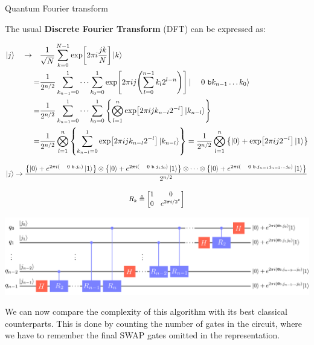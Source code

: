 \documentclass[9pt, handout, aspectratio=169]{beamer}	%
\begin{document}
\begin{frame}[allowframebreaks]{Quantum Fourier transform}

	The usual \textbf{Discrete Fourier Transform} (DFT) can be expressed as:

	\medskip

	\begin{align*}
	  \ket{j} \qra&
				\frac{1}{\sqrt{N}} \sum_{k=0}^{N-1} \exp[2\pi i \frac{jk}{N}] \ket{k} \\
	    =& \frac{1}{2^{n/2}} \sum_{k_{n-1}=0}^{1} \cdots \sum_{k_{0}=0}^{1}
	      \exp[2\pi ij \qty(\sum_{l=0}^{n-1} k_{l} 2^{l-n})]
	      \ket{\bin k_{n-1} \dots k_{0}} \\
	    =& \frac{1}{2^{n/2}} \sum_{k_{n-1}=0}^{1} \cdots \sum_{k_{0}=0}^{1}
	      \qty{ \bigotimes_{l=1}^{n} \exp[2\pi ij k_{n-l} 2^{-l}]
	      \ket{k_{n-l}} } \\
	    =& \frac{1}{2^{n/2}} \bigotimes_{l=1}^{n}
	      \qty{ \sum_{k_{n-l}=0}^{1} \exp[2\pi ij k_{n-l} 2^{-l}] \ket{k_{n-l}} }
	    = \frac{1}{2^{n/2}} \bigotimes_{l=1}^{n}
	      \qty{ \ket{0} + \exp[2\pi ij 2^{-l}] \ket{1} }
	\end{align*}

\break

	\begin{gather*}
		\ket{j} \ra
			\frac{
				\qty{\ket{0}+ e^{2\pi i \qty(\bin.j_{0})} \ket{1}} \otimes
				\qty{\ket{0}+ e^{2\pi i \qty(\bin.j_{1}j_{0})} \ket{1}} \otimes
				\cdots \otimes
				\qty{\ket{0} + e^{2\pi i \qty(\bin.j_{n-1}j_{n-2} \dots j_{0})} \ket{1}}
			}{2^{n/2}} \\[10pt]
		R_{k} \defeq \mqty[1 & 0 \\ 0 & e^{2\pi i/2^k}]
	\end{gather*}

	\vspace{-2em}

	\begin{center}
		\includegraphics[width=.80\paperwidth]{Figures/quantum-background/quantum-fourier-transform}
	\end{center}

\break

	We can now compare the complexity of this algorithm with its best classical counterparts. This is done by counting the number of gates in the circuit, where we have to remember the final SWAP gates omitted in the representation.


\end{frame}
\end{document}
